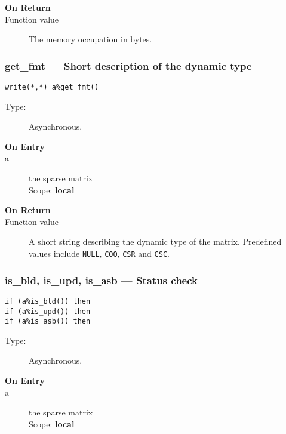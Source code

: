 \begin{description}
\item[\bf On Return]
\item[Function value] The memory occupation in bytes.
\end{description}


\subsubsection{get\_fmt  --- Short description of the dynamic type}

\begin{verbatim}
write(*,*) a%get_fmt()
\end{verbatim}

\begin{description}
\item[Type:] Asynchronous.
\item[\bf On Entry]
\item[a] the sparse matrix\\
Scope: {\bf local}\\
\end{description}

\begin{description}
\item[\bf On Return]
\item[Function value] A short string describing the dynamic type of
  the matrix. Predefined values include \verb|NULL|, \verb|COO|,
  \verb|CSR| and \verb|CSC|. 
\end{description}

\subsubsection{is\_bld, is\_upd, is\_asb  --- Status check}

\begin{verbatim}
if (a%is_bld()) then 
if (a%is_upd()) then 
if (a%is_asb()) then 
\end{verbatim}

\begin{description}
\item[Type:] Asynchronous.
\item[\bf On Entry]
\item[a] the sparse matrix\\
Scope: {\bf local}\\
\end{description}

